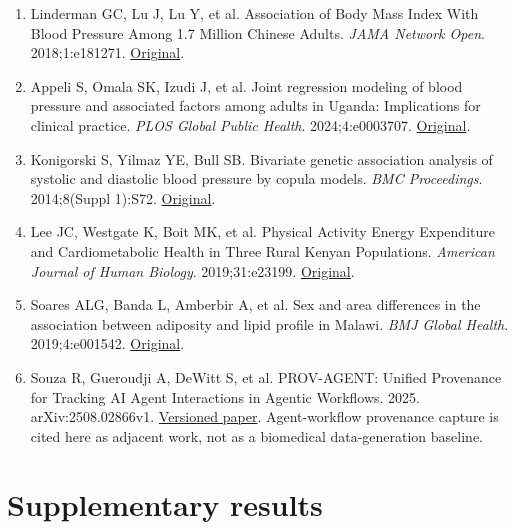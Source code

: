 \documentclass[11pt,letterpaper]{article}
\begin{document}
\begin{enumerate}[label=\arabic*.,leftmargin=2.1em,itemsep=.2em,parsep=0pt]
\item Linderman GC, Lu J, Lu Y, et al. Association of Body Mass Index With Blood Pressure Among 1.7 Million Chinese Adults. \emph{JAMA Network Open}. 2018;1:e181271. \href{https://pmc.ncbi.nlm.nih.gov/articles/PMC6324286/}{Original}.

\item Appeli S, Omala SK, Izudi J, et al. Joint regression modeling of blood pressure and associated factors among adults in Uganda: Implications for clinical practice. \emph{PLOS Global Public Health}. 2024;4:e0003707. \href{https://pmc.ncbi.nlm.nih.gov/articles/PMC11392332/}{Original}.

\item Konigorski S, Yilmaz YE, Bull SB. Bivariate genetic association analysis of systolic and diastolic blood pressure by copula models. \emph{BMC Proceedings}. 2014;8(Suppl 1):S72. \href{https://pmc.ncbi.nlm.nih.gov/articles/PMC4143670/}{Original}.

\item Lee JC, Westgate K, Boit MK, et al. Physical Activity Energy Expenditure and Cardiometabolic Health in Three Rural Kenyan Populations. \emph{American Journal of Human Biology}. 2019;31:e23199. \href{https://pmc.ncbi.nlm.nih.gov/articles/PMC6435188/}{Original}.

\item Soares ALG, Banda L, Amberbir A, et al. Sex and area differences in the association between adiposity and lipid profile in Malawi. \emph{BMJ Global Health}. 2019;4:e001542. \href{https://pmc.ncbi.nlm.nih.gov/articles/PMC6747887/}{Original}.

\item Souza R, Gueroudji A, DeWitt S, et al. PROV-AGENT: Unified Provenance for Tracking AI Agent Interactions in Agentic Workflows. 2025. arXiv:2508.02866v1. \href{https://arxiv.org/html/2508.02866v1}{Versioned paper}. Agent-workflow provenance capture is cited here as adjacent work, not as a biomedical data-generation baseline.

\end{enumerate}

\endgroup

\clearpage

\appendix

\section*{Supplementary results}

\setcounter{figure}{0}
\end{document}
